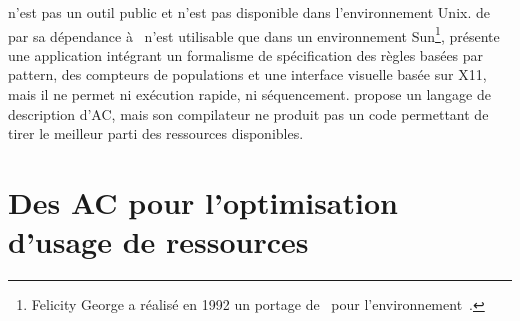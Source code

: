 n'est pas un outil public et n'est pas disponible dans
l'environnement Unix. %
 de par sa d\'ependance \`a~ n'est
utilisable que dans un environnement Sun\footnote{%
  Felicity George a r\'ealis\'e en 1992 un portage de~ pour
  l'environnement~.}, %
 pr\'esente une application int\'egrant un formalisme de
sp\'ecification des r\`egles bas\'ees par pattern, des compteurs de
populations et une interface visuelle bas\'ee sur X11, mais il ne permet ni
ex\'ecution rapide, ni s\'equencement. %
 propose un langage de description d'AC, mais son
compilateur ne produit pas un code permettant de tirer le meilleur
parti des ressources disponibles. %

\section{Des AC pour l'optimisation d'usage de ressources}

